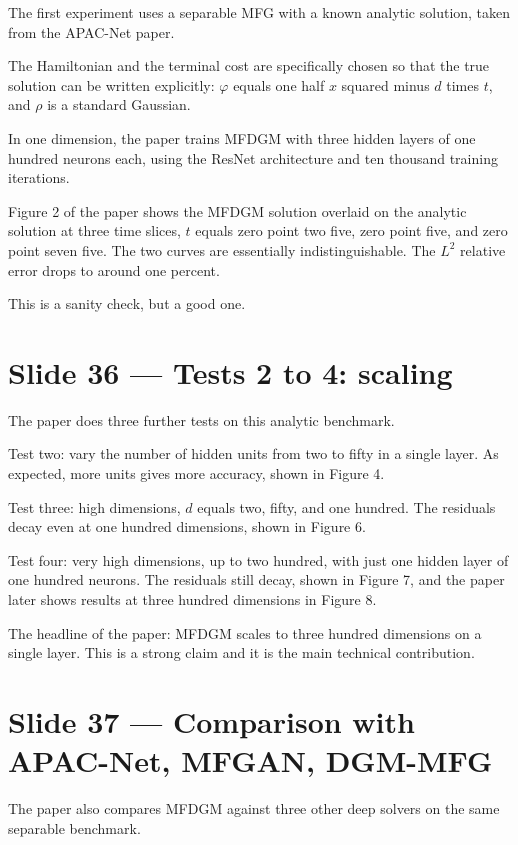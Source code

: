 \documentclass[11pt]{article}
\begin{document}
The first experiment uses a separable MFG with a known analytic solution,
taken from the APAC-Net paper.

The Hamiltonian and the terminal cost are specifically chosen so that the
true solution can be written explicitly: $\varphi$ equals one half $x$
squared minus $d$ times $t$, and $\rho$ is a standard Gaussian.

In one dimension, the paper trains MFDGM with three hidden layers of one
hundred neurons each, using the ResNet architecture and ten thousand
training iterations.

Figure 2 of the paper shows the MFDGM solution overlaid on the analytic
solution at three time slices, $t$ equals zero point two five, zero point
five, and zero point seven five. The two curves are essentially
indistinguishable. The $L^2$ relative error drops to around one percent.

This is a sanity check, but a good one.

\section*{Slide 36 --- Tests 2 to 4: scaling}

The paper does three further tests on this analytic benchmark.

Test two: vary the number of hidden units from two to fifty in a single
layer. As expected, more units gives more accuracy, shown in Figure 4.

Test three: high dimensions, $d$ equals two, fifty, and one hundred. The
residuals decay even at one hundred dimensions, shown in Figure 6.

Test four: very high dimensions, up to two hundred, with just one hidden
layer of one hundred neurons. The residuals still decay, shown in Figure 7,
and the paper later shows results at three hundred dimensions in Figure 8.

The headline of the paper: MFDGM scales to three hundred dimensions on a
single layer. This is a strong claim and it is the main technical
contribution.

\section*{Slide 37 --- Comparison with APAC-Net, MFGAN, DGM-MFG}

The paper also compares MFDGM against three other deep solvers on the same
separable benchmark.
\end{document}
